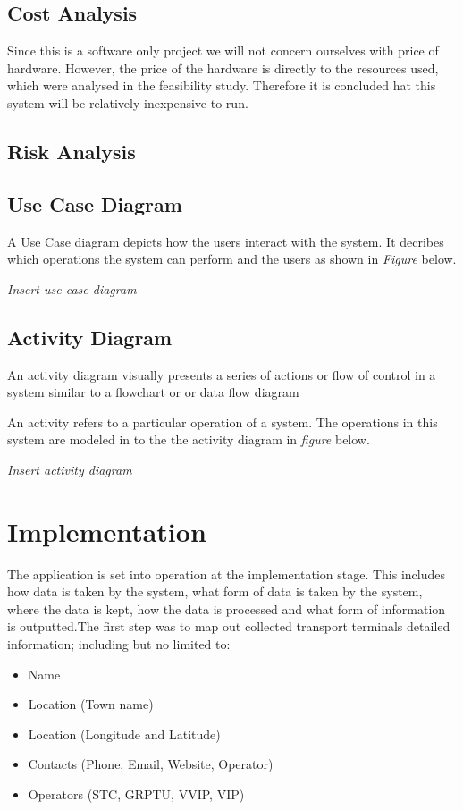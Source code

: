 \subsection{Cost Analysis}
Since this is a software only project we will not concern ourselves with price of hardware.  However, the price of the hardware is directly to the resources used, which were analysed in the feasibility study. Therefore it is concluded hat this system will be relatively inexpensive to run.

\subsection{Risk Analysis}

\subsection{Use Case Diagram}
A Use Case diagram depicts how the users interact with the system. It decribes which operations the system can perform and the users as shown in \textit{Figure } below.

\textit{Insert use case diagram}

\subsection{Activity Diagram}
An activity diagram visually presents a series of actions or flow of control in a system similar to a flowchart or or data flow diagram 

An activity refers to a particular operation of a system. The operations in this system are modeled in to the the activity diagram in \textit{figure } below.

\textit{Insert activity diagram}

\section{Implementation}
The application is set into operation at the implementation stage. This includes how data is taken by the system, what form of data is taken by the system, where the data is kept, how the data is processed and what form of information is outputted.The first step was to map out collected transport terminals detailed information; including but no limited to:
\begin{itemize}
	\item Name
	\item Location (Town name)
	\item Location (Longitude and Latitude)
	\item Contacts (Phone, Email, Website, Operator)
	\item Operators (STC, GRPTU, VVIP, VIP)
\end{itemize}


